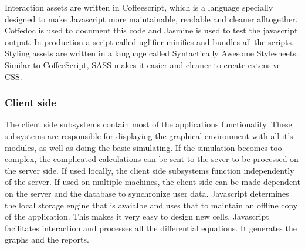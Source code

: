 \documentclass{report}
\begin{document}
					Interaction assets are written in Coffeescript, which is a language specially designed to make Javascript more maintainable, readable and cleaner alltogether. Coffedoc is used to document this code and Jasmine is used to test the javascript output. In production a script called uglifier minifies and bundles all the scripts.
					Styling assets are written in a language called Syntactically Awesome Stylesheets. Similar to CoffeeScript, SASS makes it easier and cleaner to create extensive CSS. 
			\subsubsection{Client side}
				The client side subsystems contain most of the applications functionality. These subsystems are responsible for displaying the graphical environment with all it's modules, as well as doing the basic simulating. If the simulation becomes too complex, the complicated calculations can be sent to the sever to be processed on the server side. If used locally, the client side subsystems function independently of the server. If used on multiple machines, the client side can be made dependent on the server and the database to synchronize user data.
					Javascript determines the local storage engine that is avaialbe and uses that to maintain an offline copy of the application. This makes it very easy to design new cells. 
					Javascript facilitates interaction and processes all the differential equations. It generates the graphs and the reports. 
\end{document}
